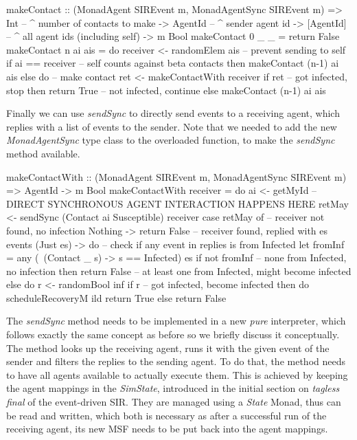 \begin{HaskellCode}
makeContact :: (MonadAgent SIREvent m, MonadAgentSync SIREvent m)
            => Int       -- ^ number of contacts to make
            -> AgentId   -- ^ sender agent id
            -> [AgentId] -- ^ all agent ids (including self)
            -> m Bool
makeContact 0 _ _ = return False
makeContact n ai ais = do
  receiver <- randomElem ais
  -- prevent sending to self
  if ai == receiver
    -- self counts against beta contacts
    then makeContact (n-1) ai ais
    else do
      -- make contact
      ret <- makeContactWith receiver
      if ret
        -- got infected, stop
        then return True
        -- not infected, continue
        else makeContact (n-1) ai ais
\end{HaskellCode}

Finally we can use \textit{sendSync} to directly send events to a receiving agent, which replies with a list of events to the sender. Note that we needed to add the new \textit{MonadAgentSync} type class to the overloaded function, to make the \textit{sendSync} method available.

\begin{HaskellCode}
makeContactWith :: (MonadAgent SIREvent m, MonadAgentSync SIREvent m) 
                => AgentId -> m Bool
makeContactWith receiver = do
  ai     <- getMyId
  -- DIRECT SYNCHRONOUS AGENT INTERACTION HAPPENS HERE
  retMay <- sendSync (Contact ai Susceptible) receiver
  case retMay of 
    -- receiver not found, no infection
    Nothing -> return False
    -- receiver found, replied with es events
    (Just es) -> do
      -- check if any event in replies is from Infected
      let fromInf = any (\ (Contact _ s) -> s == Infected) es
      if not fromInf
        -- none from Infected, no infection
        then return False
        -- at least one from Infected, might become infected
        else do
          r <- randomBool inf
          if r 
            -- got infected, become infected
            then do
              scheduleRecoveryM ild
              return True
            else return False
\end{HaskellCode}

The \textit{sendSync} method needs to be implemented in a new \textit{pure} interpreter, which follows exactly the same concept as before so we briefly discuss it conceptually. The method looks up the receiving agent, runs it with the given event of the sender and filters the replies to the sending agent. To do that, the method needs to have all agents available to actually execute them. This is achieved by keeping the agent mappings in the \textit{SimState}, introduced in the initial section on \textit{tagless final} of the event-driven SIR. They are managed using a \textit{State} Monad, thus can be read and written, which both is necessary as after a successful run of the receiving agent, its new MSF needs to be put back into the agent mappings.


